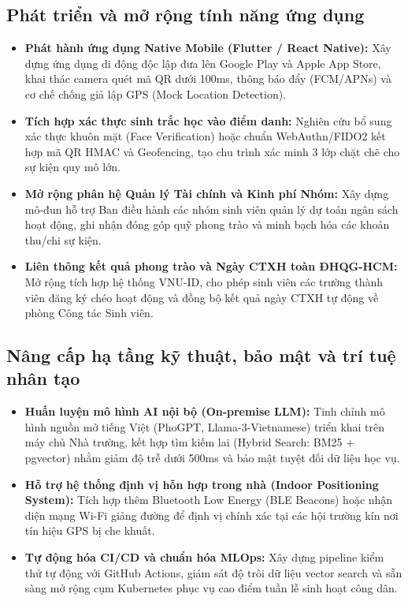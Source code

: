 \subsection{Phát triển và mở rộng tính năng ứng dụng}
\begin{itemize}[leftmargin=*, noitemsep]
    \item \textbf{Phát hành ứng dụng Native Mobile (Flutter / React Native):} Xây dựng ứng dụng di động độc lập đưa lên Google Play và Apple App Store, khai thác camera quét mã QR dưới 100ms, thông báo đẩy (FCM/APNs) và cơ chế chống giả lập GPS (Mock Location Detection).
    \item \textbf{Tích hợp xác thực sinh trắc học vào điểm danh:} Nghiên cứu bổ sung xác thực khuôn mặt (Face Verification) hoặc chuẩn WebAuthn/FIDO2 kết hợp mã QR HMAC và Geofencing, tạo chu trình xác minh 3 lớp chặt chẽ cho sự kiện quy mô lớn.
    \item \textbf{Mở rộng phân hệ Quản lý Tài chính và Kinh phí Nhóm:} Xây dựng mô-đun hỗ trợ Ban điều hành các nhóm sinh viên quản lý dự toán ngân sách hoạt động, ghi nhận đóng góp quỹ phong trào và minh bạch hóa các khoản thu/chi sự kiện.
    \item \textbf{Liên thông kết quả phong trào và Ngày CTXH toàn ĐHQG-HCM:} Mở rộng tích hợp hệ thống VNU-ID, cho phép sinh viên các trường thành viên đăng ký chéo hoạt động và đồng bộ kết quả ngày CTXH tự động về phòng Công tác Sinh viên.
\end{itemize}

\subsection{Nâng cấp hạ tầng kỹ thuật, bảo mật và trí tuệ nhân tạo}
\begin{itemize}[leftmargin=*, noitemsep]
    \item \textbf{Huấn luyện mô hình AI nội bộ (On-premise LLM):} Tinh chỉnh mô hình nguồn mở tiếng Việt (PhoGPT, Llama-3-Vietnamese) triển khai trên máy chủ Nhà trường, kết hợp tìm kiếm lai (Hybrid Search: BM25 + pgvector) nhằm giảm độ trễ dưới 500ms và bảo mật tuyệt đối dữ liệu học vụ.
    \item \textbf{Hỗ trợ hệ thống định vị hỗn hợp trong nhà (Indoor Positioning System):} Tích hợp thêm Bluetooth Low Energy (BLE Beacons) hoặc nhận diện mạng Wi-Fi giảng đường để định vị chính xác tại các hội trường kín nơi tín hiệu GPS bị che khuất.
    \item \textbf{Tự động hóa CI/CD và chuẩn hóa MLOps:} Xây dựng pipeline kiểm thử tự động với GitHub Actions, giám sát độ trôi dữ liệu vector search và sẵn sàng mở rộng cụm Kubernetes phục vụ cao điểm tuần lễ sinh hoạt công dân.
\end{itemize}